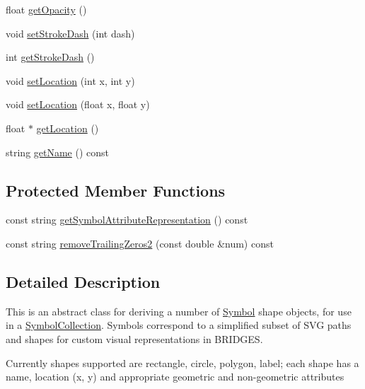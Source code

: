 \begin{DoxyCompactItemize}
\item 
float \mbox{\hyperlink{classbridges_1_1_symbol_abeda0c1f43346b91f028d2df80e270dc}{get\+Opacity}} ()
\item 
void \mbox{\hyperlink{classbridges_1_1_symbol_ab74d4afc6805db5be7613a82c7295c61}{set\+Stroke\+Dash}} (int dash)
\item 
int \mbox{\hyperlink{classbridges_1_1_symbol_aebd8935bc4f963a04412aa544beee27b}{get\+Stroke\+Dash}} ()
\item 
void \mbox{\hyperlink{classbridges_1_1_symbol_a9a1bdebb8dcec2871243a269e618a351}{set\+Location}} (int x, int y)
\item 
void \mbox{\hyperlink{classbridges_1_1_symbol_a5f774c3cbd407bc74d43e8d27bb6933f}{set\+Location}} (float x, float y)
\item 
float $\ast$ \mbox{\hyperlink{classbridges_1_1_symbol_a97f8b30d76dd0d8dd49167628bb3f810}{get\+Location}} ()
\item 
string \mbox{\hyperlink{classbridges_1_1_symbol_a798c3871fe791a841ab0e558807e5c6b}{get\+Name}} () const
\end{DoxyCompactItemize}
\subsection*{Protected Member Functions}
\begin{DoxyCompactItemize}
\item 
const string \mbox{\hyperlink{classbridges_1_1_symbol_a7818993a154ee736fe3d3ed65ce7d76e}{get\+Symbol\+Attribute\+Representation}} () const
\item 
const string \mbox{\hyperlink{classbridges_1_1_symbol_aafd36d8f24b250ccf3003f5b7b73d717}{remove\+Trailing\+Zeros2}} (const double \&num) const
\end{DoxyCompactItemize}


\subsection{Detailed Description}
This is an abstract class for deriving a number of \mbox{\hyperlink{classbridges_1_1_symbol}{Symbol}} shape objects, for use in a \mbox{\hyperlink{classbridges_1_1_symbol_collection}{Symbol\+Collection}}. Symbols correspond to a simplified subset of S\+VG paths and shapes for custom visual representations in B\+R\+I\+D\+G\+ES. 

Currently shapes supported are rectangle, circle, polygon, label; each shape has a name, location (x, y) and appropriate geometric and non-\/geometric attributes


